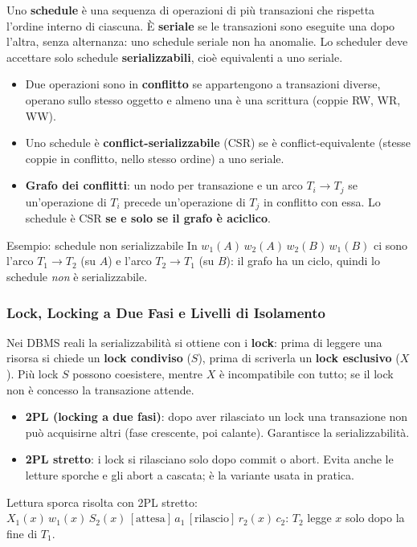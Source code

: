 \documentclass[12pt]{extarticle}
\begin{document}
\noindent Uno \textbf{schedule} è una sequenza di operazioni di più transazioni che rispetta l'ordine interno di ciascuna. È \textbf{seriale} se le transazioni sono eseguite una dopo l'altra, senza alternanza: uno schedule seriale non ha anomalie. Lo scheduler deve accettare solo schedule \textbf{serializzabili}, cioè equivalenti a uno seriale.
\begin{itemize}
    \item Due operazioni sono in \textbf{conflitto} se appartengono a transazioni diverse, operano sullo stesso oggetto e almeno una è una scrittura (coppie RW, WR, WW).
    \item Uno schedule è \textbf{conflict-serializzabile} (CSR) se è conflict-equivalente (stesse coppie in conflitto, nello stesso ordine) a uno seriale.
    \item \textbf{Grafo dei conflitti}: un nodo per transazione e un arco $T_i \to T_j$ se un'operazione di $T_i$ precede un'operazione di $T_j$ in conflitto con essa. Lo schedule è CSR \textbf{se e solo se il grafo è aciclico}.
\end{itemize}

\begin{cbox}{Esempio: schedule non serializzabile}
In $w_1(A)\,w_2(A)\,w_2(B)\,w_1(B)$ ci sono l'arco $T_1 \to T_2$ (su $A$) e l'arco $T_2 \to T_1$ (su $B$): il grafo ha un ciclo, quindi lo schedule \emph{non} è serializzabile.
\end{cbox}

\subsubsection{Lock, Locking a Due Fasi e Livelli di Isolamento}

\noindent Nei DBMS reali la serializzabilità si ottiene con i \textbf{lock}: prima di leggere una risorsa si chiede un \textbf{lock condiviso} ($S$), prima di scriverla un \textbf{lock esclusivo} ($X$). Più lock $S$ possono coesistere, mentre $X$ è incompatibile con tutto; se il lock non è concesso la transazione attende.
\begin{itemize}
    \item \textbf{2PL (locking a due fasi)}: dopo aver rilasciato un lock una transazione non può acquisirne altri (fase crescente, poi calante). Garantisce la serializzabilità.
    \item \textbf{2PL stretto}: i lock si rilasciano solo dopo commit o abort. Evita anche le letture sporche e gli abort a cascata; è la variante usata in pratica.
\end{itemize}
Lettura sporca risolta con 2PL stretto: $X_1(x)\,w_1(x)\,S_2(x)\,[\text{attesa}]\,a_1\,[\text{rilascio}]\,r_2(x)\,c_2$: $T_2$ legge $x$ solo dopo la fine di $T_1$.
\end{document}
